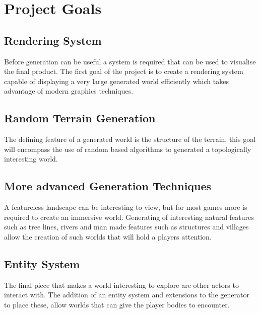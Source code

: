 \section{Project Goals}
\subsection{Rendering System}
Before generation can be useful a system is required that can be used to 
visualise the final product. The first goal of the project is to create a
rendering system capable of displaying a very large generated world efficiently 
which takes advantage of modern graphics techniques.\\

\subsection{Random Terrain Generation}
The defining feature of a generated world is the structure of the terrain, this
goal will encompass the use of random based algorithms to generated a 
topologically interesting world.\\

\subsection{More advanced Generation Techniques}
A featureless landscape can be interesting to view, but for most games more is 
required to create an immersive world. Generating of interesting natural features
such as tree lines, rivers and man made features such as structures and villages
allow the creation of such worlds that will hold a players attention.

\subsection{Entity System}
The final piece that makes a world interesting to explore are other actors to 
interact with. The addition of an entity system and extensions to the generator
to place these, allow worlds that can give the player bodies to encounter.\\
